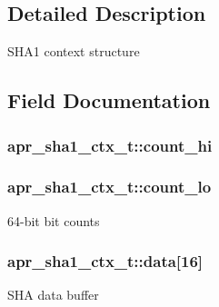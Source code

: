 \subsection{Detailed Description}
S\+H\+A1 context structure 

\subsection{Field Documentation}
\subsubsection[{\texorpdfstring{count\+\_\+hi}{count_hi}}]{ apr\+\_\+sha1\+\_\+ctx\+\_\+t\+::count\+\_\+hi}\hypertarget{structapr__sha1__ctx__t_a32a4c5248869c36344cc7aac8b87f2d1}{}\label{structapr__sha1__ctx__t_a32a4c5248869c36344cc7aac8b87f2d1}
\subsubsection[{\texorpdfstring{count\+\_\+lo}{count_lo}}]{ apr\+\_\+sha1\+\_\+ctx\+\_\+t\+::count\+\_\+lo}\hypertarget{structapr__sha1__ctx__t_ab105efa48b9318a419525e0f6076f6d2}{}\label{structapr__sha1__ctx__t_ab105efa48b9318a419525e0f6076f6d2}
64-\/bit bit counts 
\subsubsection[{\texorpdfstring{data}{data}}]{ apr\+\_\+sha1\+\_\+ctx\+\_\+t\+::data\mbox{[}16\mbox{]}}\hypertarget{structapr__sha1__ctx__t_af61fc6c30be244247e35e7c8b0b63407}{}\label{structapr__sha1__ctx__t_af61fc6c30be244247e35e7c8b0b63407}
S\+HA data buffer 
